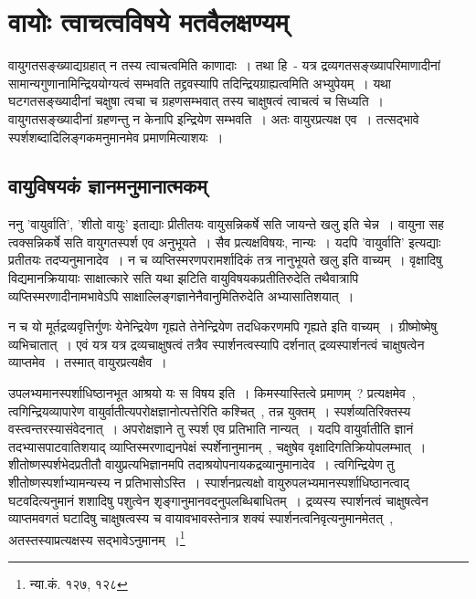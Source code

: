 	\section{वायोः त्वाचत्वविषये मतवैलक्षण्यम्}

	वायुगतसङ्ख्याद्यग्रहात् न तस्य त्वाचत्वमिति काणादाः~। तथा हि~-  यत्र द्रव्यगतसङ्ख्यापरिमाणादीनां सामान्यगुणानामिन्द्रिययोग्यत्वं सम्भवति तद्द्रवस्यापि तदिन्द्रियग्राह्यत्वमिति अभ्युपेयम्~।‌ यथा घटगतसङ्ख्यादीनां चक्षुषा त्वचा च ग्रहणसम्भवात् तस्य चाक्षुषत्वं त्वाचत्वं च सिध्यति~। वायुगतसङ्ख्यादीनां ग्रहणन्तु न केनापि इन्द्रियेण सम्भवति~। अतः वायुरप्रत्यक्ष एव~। तत्सद्भावे स्पर्शशब्दादिलिङ्गकमनुमानमेव प्रमाणमित्याशयः~।

		\subsection{वायुविषयकं ज्ञानमनुमानात्मकम्}

		 ननु 'वायुर्वाति', 'शीतो वायुः' इताद्याः प्रीतीतयः वायुसन्निकर्षे सति जायन्ते खलु इति चेन्न~। वायुना सह त्वक्सन्निकर्षे सति वायुगतस्पर्श एव अनुभूयते~। सैव प्रत्यक्षविषयः, नान्यः~। यदपि 'वायुर्वाति' इत्यद्याः प्रतीतयः तदप्यनुमानादेव~। न च व्यप्तिस्मरणपरामर्शादिकं तत्र नानुभूयते खलु इति वाच्यम्~। वृक्षादिषु विद्यमानक्रियायाः साक्षात्कारे सति यथा झटिति वायुविषयकप्रतीतिरुदेति तथैवात्रापि व्यप्तिस्मरणादीनामभावेऽपि साक्षाल्लिङ्गज्ञानेनैवानुमितिरुदेति अभ्यासातिशयात्~। 
		 
		 न च यो मूर्तद्रव्यवृत्तिर्गुणः येनेन्द्रियेण गृह्यते तेनेन्द्रियेण तदधिकरणमपि गृह्यते इति वाच्यम्~। ग्रीष्मोष्मेषु व्यभिचातात्~। एवं यत्र यत्र द्रव्यचाक्षुषत्वं तत्रैव स्पार्शनत्वस्यापि दर्शनात् द्रव्यस्पार्शनत्वं चाक्षुषत्वेन व्याप्तमेव~। तस्मात् वायुरप्रत्यक्षैव~।
		 
		{\fontsize{11.7}{0}\selectfont\s  उपलभ्यमानस्पर्शाधिष्ठानभूत आश्रयो यः स विषय इति~। किमस्यास्तित्वे प्रमाणम्~? प्रत्यक्षमेव~, त्वगिन्द्रियव्यापारेण वायुर्वातीत्यपरोक्षज्ञानोत्पत्तेरिति कश्चित्~, तन्न युक्तम्~। स्पर्शव्यतिरिक्तस्य वस्त्वन्तरस्यासंवेदनात्~। अपरोक्षज्ञाने तु स्पर्श एव प्रतिभाति नान्यत्~। यदपि वायुर्वातीति ज्ञानं तदभ्यासपाटवातिशयाद् व्याप्तिस्मरणाद्यनपेक्षं स्पर्शेनानुमानम्~, चक्षुषेव वृक्षादिगतिक्रियोपलम्भात्~। शीतोष्णस्पर्शभेदप्रतीतौ वायुप्रत्यभिज्ञानमपि तदाश्रयोपनायकद्रव्यानुमानादेव~। त्वगिन्द्रियेण तु शीतोष्णस्पर्शाभ्यामन्यस्य न प्रतिभासोऽस्ति~। स्पार्शनप्रत्यक्षो वायुरुपलभ्यमानस्पर्शाधिष्ठानत्वाद् घटवदित्यनुमानं शशादिषु पशुत्वेन शृङ्गानुमानवदनुपलब्धिबाधितम्~। द्रव्यस्य स्पार्शनत्वं चाक्षुषत्वेन व्याप्तमवगतं घटादिषु चाक्षुषत्वस्य च वायावभावस्तेनात्र शक्यं स्पार्शनत्वनिवृत्यनुमानमेतत्~, अतस्तस्याप्रत्यक्षस्य सद्भावेऽनुमानम्~।\footnote{न्या.कं. १२७, १२८}}

